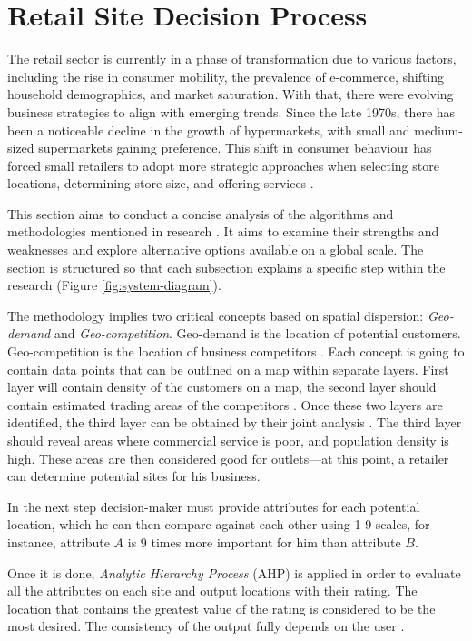 \chapter{Retail Site Decision Process}
\label{ch:2}

The retail sector is currently in a phase of transformation due to various factors, including the rise in consumer mobility, the prevalence of e-commerce, shifting household demographics, and market saturation. With that, there were evolving 
business strategies to align with emerging trends. Since the late 1970s, there has been a noticeable decline in the growth of hypermarkets, with small and medium-sized supermarkets gaining preference. This shift in consumer behaviour has forced small retailers to adopt more strategic approaches when selecting store locations, determining store size, and offering services \cite{mendes2004multi}.

This section aims to conduct a concise analysis of the algorithms and methodologies mentioned in research \cite{roig2013retail}. It aims to examine their strengths and weaknesses and explore alternative options available on a global scale. The section is structured so that each subsection explains a specific step within the research (Figure \ref{fig:system-diagram}).

The methodology implies two critical concepts based on spatial dispersion: \textit{Geo-demand} and \textit{Geo-competition}. Geo-demand is the location of potential customers. Geo-competition is the location of business competitors \cite{baviera2012trade}. Each concept is going to contain data points that can be outlined on a map within separate layers. First layer will contain density of the customers on a map, the second layer should contain estimated trading areas of the competitors \cite{roig2013retail}. Once these two layers are identified, the third layer can be obtained by their joint analysis \cite{baviera2012trade}. The third layer should reveal areas where commercial service is poor, and population density is high. These areas are then considered good for outlets---at this point, a retailer can determine potential sites for his business. 

In the next step decision-maker must provide attributes for each potential location, which he can then compare against each other using 1-9 scales, for instance, attribute $A$ is 9 times more important for him than attribute $B$. 

Once it is done, \textit{Analytic Hierarchy Process} (AHP) is applied in order to evaluate all the attributes on each site and output locations with their rating. The location that contains the greatest value of the rating is considered to be the most desired. The consistency of the output fully depends on the user \cite{roig2013retail}.


